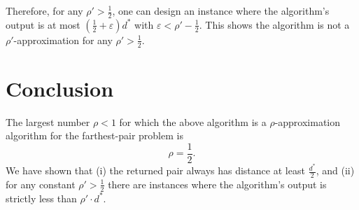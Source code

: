 \documentclass[letterpaper, 11pt]{article}
\newcommand{\1}{\mathds{1}}	%
\theoremstyle{definition}
\newenvironment{solution}{{\par\noindent\it Solution.}}{}
\begin{document}
\begin{solution}
Therefore, for any \(\rho' > \frac{1}{2}\), one can design an instance where the algorithm’s output is at most \(\left(\frac{1}{2} + \varepsilon\right) d^*\) with \(\varepsilon < \rho' - \frac{1}{2}\). This shows the algorithm is not a \(\rho'\)-approximation for any \(\rho' > \frac{1}{2}\).

\section*{Conclusion}

The largest number \(\rho < 1\) for which the above algorithm is a \(\rho\)-approximation algorithm for the farthest-pair problem is
\[
\rho = \frac{1}{2}.
\]
We have shown that (i) the returned pair always has distance at least \(\frac{d^*}{2}\), and (ii) for any constant \(\rho' > \frac{1}{2}\) there are instances where the algorithm’s output is strictly less than \(\rho' \cdot d^*\).
\end{solution}
\clearpage
\end{document}
